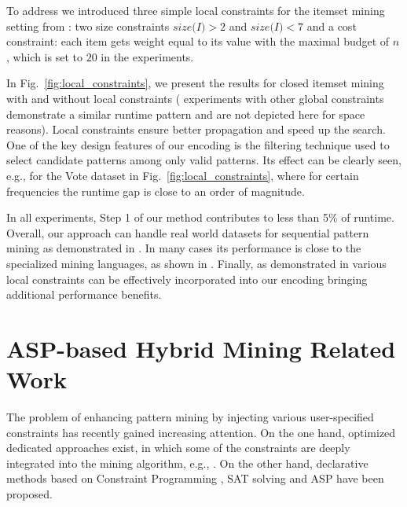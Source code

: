 {To %
address \qthree we introduced three simple local constraints %
for the itemset mining setting from \qtwo: %
two size constraints $\textit{size(I)} > 2$ and $\textit{size(I)} < 7$ and a cost constraint: each item gets weight equal to its value with the maximal budget of $n$, which is set to $20$ in the experiments. %

In Fig.~\ref{fig:local_constraints}, we present the results for closed itemset mining with and without local constraints (%
experiments with other global constraints demonstrate a similar runtime pattern and are not depicted here for space reasons). %
Local constraints ensure %
better propagation and speed up the search. One of the key design features of our encoding is the filtering technique used to select candidate patterns among only valid patterns. Its effect can be clearly seen, e.g., for the Vote dataset in Fig.~\ref{fig:local_constraints}, where for certain frequencies the runtime gap is close to an order of magnitude.

In all experiments, Step 1 of our method contributes to less than 5\% of runtime. Overall, our approach can handle real world datasets for sequential pattern mining as demonstrated in \qone. In many cases %
its performance is %
close to the specialized mining languages, as %
shown in \qtwo. Finally, as demonstrated in \qthree various local constraints can be effectively incorporated into our encoding
bringing additional performance benefits. %

\section{ASP-based Hybrid Mining Related Work}\label{sec:hybrid_relwork}

The problem of enhancing pattern mining by injecting various user-specified constraints has recently gained increasing attention. On the one hand, optimized dedicated approaches exist, in which some of the constraints are deeply integrated into the mining algorithm, e.g., \parencite{DBLP:conf/kdd/PeiH00}.  On the other hand, %
declarative methods based on Constraint Programming \parencite{sky2014,DBLP:conf/cpaior/NegrevergneG15,DBLP:journals/corr/MetivierLC13}, SAT solving \parencite{DBLP:conf/pakdd/JabbourSS15,DBLP:conf/cikm/JabbourSS13} and ASP \parencite{DBLP:conf/lpnmr/Jarvisalo11,DBLP:conf/ijcai/GebserGQ0S16,DBLP:journals/corr/GuyetMQ14} have been proposed. 

}

